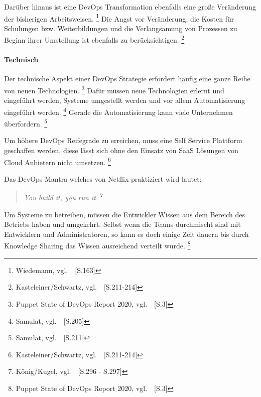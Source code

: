 Darüber hinaus ist eine DevOps Transformation ebenfalls eine große Veränderung der bisherigen Arbeitsweisen. \footnote{Wiedemann, vgl.~\cite{Wiedemann2019}~[S.163]}
Die Angst vor Veränderung, die Kosten für Schulungen bzw. Weiterbildungen und die Verlangsamung von Prozessen zu Beginn ihrer Umstellung
ist ebenfalls zu berücksichtigen. \footnote{Kasteleiner/Schwartz, vgl.~\cite{Kasteleiner2019}~[S.211-214]}

\paragraph{Technisch}

Der technische Aspekt einer DevOps Strategie erfordert häufig eine ganze Reihe von neuen Technologien. \footnote{Puppet State of DevOps Report 2020, vgl.~\cite{PUPPET}~[S.3]}
Dafür müssen neue Technologien erlernt und eingeführt werden, Systeme umgestellt werden und vor allem Automatisierung eingeführt werden. \footnote{Samulat, vgl.~\cite{Samulat2017}~[S.205]}
Gerade die Automatisierung kann viele Unternehmen überfordern. \footnote{Samulat, vgl.~\cite{Samulat2017}~[S.211]}

Um höhere DevOps Reifegrade zu erreichen, muss eine Self Service Plattform geschaffen werden, diese lässt sich ohne
den Einsatz von SaaS Lösungen von Cloud Anbietern nicht umsetzen. \footnote{Kasteleiner/Schwartz, vgl.~\cite{Kasteleiner2019}~[S.211-214]}

Das DevOps Mantra welches von Netflix praktiziert wird lautet:

\begin{quotation}
    \textsl{You build it, you run it.}
    \footnote{König/Kugel, vgl.~\cite{Konig2019}~[S.296 - S.297]}
\end{quotation}

Um Systeme zu betreiben, müssen die Entwickler Wissen aus dem Bereich des Betriebs haben und umgekehrt.
Selbst wenn die Teams durchmischt sind mit Entwicklern und Administratoren, so kann es doch einige Zeit dauern
bis durch Knowledge Sharing das Wissen ausreichend verteilt wurde. \footnote{Puppet State of DevOps Report 2020, vgl.~\cite{PUPPET}~[S.3]}


